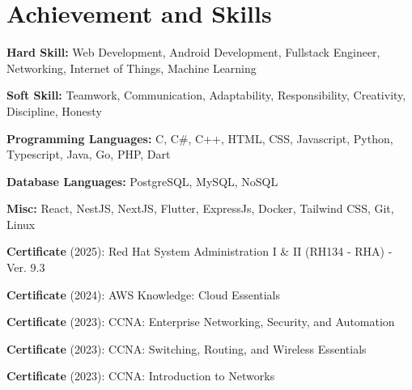 \documentclass[../main.tex]{subfiles}
\begin{document}
\section{Achievement and Skills}
\begin{highlights}
    \item \textbf{Hard Skill:} Web Development, Android Development, Fullstack Engineer, Networking, Internet of Things, Machine Learning
    \item \textbf{Soft Skill:} Teamwork, Communication, Adaptability, Responsibility, Creativity, Discipline, Honesty
    \item \textbf{Programming Languages:} C, C\#, C++, HTML, CSS, Javascript, Python, Typescript, Java, Go, PHP, Dart
    \item \textbf{Database Languages:} PostgreSQL, MySQL, NoSQL
    \item \textbf{Misc:} React, NestJS, NextJS, Flutter, ExpressJs, Docker, Tailwind CSS, Git, Linux
    \item \textbf{Certificate} (2025): Red Hat System Administration I \& II (RH134 - RHA) - Ver. 9.3
    \item \textbf{Certificate} (2024): AWS Knowledge: Cloud Essentials
    \item \textbf{Certificate} (2023): CCNA: Enterprise Networking, Security, and Automation
    \item \textbf{Certificate} (2023): CCNA: Switching, Routing, and Wireless Essentials
    \item \textbf{Certificate} (2023): CCNA: Introduction to Networks
\end{highlights}
\end{document}
